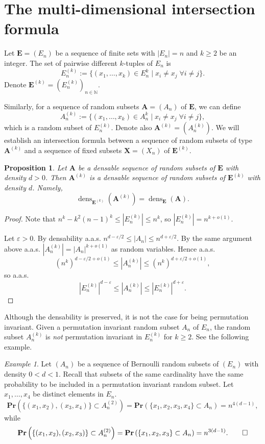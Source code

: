 \documentclass{article}
\DeclareMathOperator{\dens}{dens}
\newcommand{\bs}{\boldsymbol}
\def\Pr{\mathbf{Pr}}
\newtheorem{prop}[thm]{Proposition}
\theoremstyle{remark}
\newtheorem{ex}[thm]{Example}
\begin{document}
\section{The multi-dimensional intersection formula}

Let $\bs E = (E_n)$ be a sequence of finite sets with $|E_n| = n$ and $k\geq 2$ be an integer. The set of pairwise different $k$-tuples of $E_n$ is 
\[E_n^{(k)} := \{(x_1,\dots,x_k)\in E_n^k \;|\; x_i\neq x_j\;\forall i\neq j\}.\]
Denote $\bs E ^{(k)} = (E_n^{(k)})_{n\in \mathbb{N}}$.

Similarly, for a sequence of random subsets $\bs A = (A_n)$ of $\bs E$, we can define
\[A_n^{(k)} := \{(x_1,\dots,x_k)\in A_n^k \;|\; x_i\neq x_j\;\forall i\neq j\},\]
which is a random subset of $E_n^{(k)}$. Denote also $\bs A^{(k)} = (A_n^{(k)})$. We will establish an intersection formula between a sequence of random subsets of type $\bs A^{(k)}$ and a sequence of fixed subsets $\bs X = (X_n)$ of $\bs E^{(k)}$.

\begin{prop} 
    Let $\bs A$ be a densable sequence of random subsets of $\bs E$ with density $d>0$. Then $\bs A^{(k)}$ is a densable sequence of random subsets of $\bs E^{(k)}$ with density $d$. Namely,
    \[\dens_{\bs E^{(k)}} (\bs A^{(k)}) = \dens_{\bs E} (\bs A).\]
\end{prop}
\begin{proof}
    Note that $n^k-k^2(n-1)^k \leq |E_n^{(k)}|\leq n^k$, so $ |E_n^{(k)}|= n^{k+o(1)}$.

    Let $\varepsilon>0$. By densability a.a.s. $n^{d-\varepsilon/2}\leq |A_n| \leq n^{d+\varepsilon/2}$. By the same argument above a.a.s. $|A_n^{(k)}|= |A_n|^{k+o(1)}$ as random variables. Hence a.a.s. \[(n^k)^{d-\varepsilon/2+o(1)}\leq |A_n^{(k)}| \leq (n^k)^{d+\varepsilon/2+o(1)},\]
    so a.a.s.
    \[|E_n^{(k)}|^{d-\varepsilon}\leq |A_n^{(k)}| \leq |E_n^{(k)}|^{d+\varepsilon}.\]
\end{proof}

Although the densability is preserved, it is not the case for being permutation invariant. Given a permutation invariant random subset $A_n$ of $E_n$, the random subset $A_n^{(k)}$ is \textit{not} permutation invariant in $E_n^{(k)}$ for $k\geq 2$. See the following example.

\begin{ex} Let $(A_n)$ be a sequence of Bernoulli random subsets of $(E_n)$ with density $0<d<1$. Recall that subsets of the same cardinality have the same probability to be included in a permutation invariant random subset. Let $x_1,\dots,x_4$ be distinct elements in $E_n$. 
\[\Pr\left(\{(x_1,x_2),(x_3,x_4)\}\subset A_n^{(2)}\right) = \Pr\left(\{x_1,x_2,x_3,x_4\}\subset A_n\right) = n^{4(d-1)},\]
while
\[\Pr\left(\{(x_1,x_2),(x_2,x_3)\}\subset A_n^{(2)}\right) = \Pr\left(\{x_1,x_2,x_3\}\subset A_n\right) = n^{3(d-1)}.\qed\]
\end{ex}\quad
\end{document}
